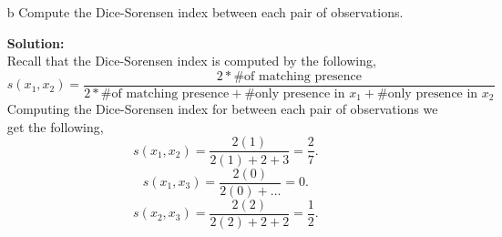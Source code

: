 \documentclass[12pt]{article}
\makeatletter
\theoremstyle{homework}
\newenvironment{exercise}[1]
{\def\@currentlabel{#1}\exercisecore}
{\endexercisecore}
\newcommand{\localhead}[1]{\par\smallskip\noindent\textbf{#1}\nobreak\\}%
\newcommand\solution{\localhead{Solution:}}
\makeatother
\begin{document}
\begin{exercise}{2}
\begin{exercise}{3}
\begin{enumerate}
      \item[b] Compute the Dice-Sorensen index between each pair of observations.\\
      \solution Recall that the Dice-Sorensen index is computed by the following, 
      \begin{equation*}
        s(x_1, x_2) = \dfrac{2*\text{\# of matching presence}} {2*\text{\# of matching presence} + \text{\# only presence in $x_1$} + \text{\# only presence in $x_2$}}
      \end{equation*}
      Computing the Dice-Sorensen index for between each pair of observations we get the following, 
      \begin{equation*}
        s(x_1, x_2) = \dfrac{2(1)}{2(1) + 2 + 3} = \dfrac{2}{7}.
      \end{equation*}
      \begin{equation*}
        s(x_1, x_3) = \dfrac{2(0)}{2(0)+\dots} = 0.
      \end{equation*}
      \begin{equation*}
        s(x_2, x_3) = \dfrac{2(2)}{2(2) + 2 + 2} = \dfrac{1}{2}.
      \end{equation*}

      \vspace{.15in}
      
      



\end{enumerate}
\end{exercise}
\end{exercise}
\end{document}
